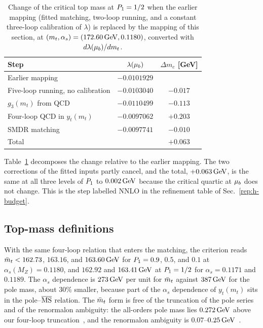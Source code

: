 \begin{table}[t]
\centering
\caption{Change of the critical top mass at $P_1=1/2$ when the earlier mapping (fitted matching, two-loop running, and a constant three-loop calibration of $\lambda$) is replaced by the mapping of this section, at $(m_t,\alpha_s)=(172.60\,\mathrm{GeV},0.1180)$, converted with $d\lambda(\mu_b)/dm_t$.} %
\label{tab:rb-smchain}
\begin{tabular}{lcc}
\toprule
Step & $\lambda(\mu_b)$ & $\Delta m_c$ [GeV] \\
\midrule
Earlier mapping & $-0.0101929$ & \\ %
Five-loop running, no calibration & $-0.0103040$ & $-0.017$ \\ %
$g_3(m_t)$ from QCD & $-0.0110499$ & $-0.113$ \\ %
Four-loop QCD in $y_t(m_t)$ & $-0.0097062$ & $+0.203$ \\ %
SMDR matching & $-0.0097741$ & $-0.010$ \\ %
\midrule
Total & & $+0.063$ \\ %
\bottomrule
\end{tabular}
\end{table}

Table~\ref{tab:rb-smchain} decomposes the change relative to the earlier mapping.
The two corrections of the fitted inputs partly cancel, and the total, $+0.063\,\mathrm{GeV}$, is the same at all three levels of $P_1$ to $0.002\,\mathrm{GeV}$ because the critical quartic at $\mu_b$ does not change. %
This is the step labelled NNLO in the refinement table of Sec.~\ref{rep:h-budget}.

\subsection{Top-mass definitions}
\label{sec:rb-mt-def}

With the same four-loop relation that enters the matching, the criterion reads $\bar m_t<162.73$, $163.16$, and $163.60\,\mathrm{GeV}$ for $P_1=0.9$, $0.5$, and $0.1$ at $\alpha_s(M_Z)=0.1180$, and $162.92$ and $163.41\,\mathrm{GeV}$ at $P_1=1/2$ for $\alpha_s=0.1171$ and $0.1189$. %
The $\alpha_s$ dependence is $273\,\mathrm{GeV}$ per unit for $\bar m_t$ against $387\,\mathrm{GeV}$ for the pole mass, about $30\%$ smaller, because part of the $\alpha_s$ dependence of $y_t(m_t)$ sits in the pole--$\overline{\mathrm{MS}}$ relation. %
The $\bar m_t$ form is free of the truncation of the pole series and of the renormalon ambiguity: the all-orders pole mass lies $0.272\,\mathrm{GeV}$ above our four-loop truncation~\cite{Beneke:2016cbu}, and the renormalon ambiguity is $0.07$--$0.25\,\mathrm{GeV}$~\cite{Beneke:2016cbu,Hoang:2020iah}. %

